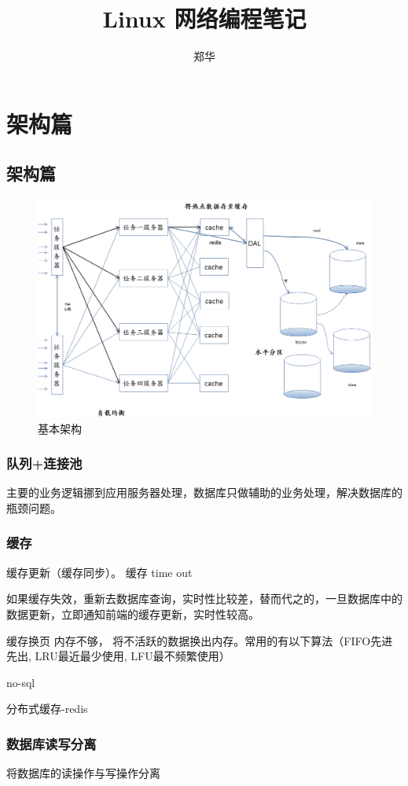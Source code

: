 \documentclass[UTF8,a4paper,12pt]{ctexbook}
\author{\kaishu 郑华}
\title{Linux  网络编程笔记}
\begin{document}
 	\maketitle
 	\tableofcontents
\chapter{架构篇}
	 \section{架构篇}
		\begin{figure}[ht]
			\centering
			\includegraphics[width=0.8\linewidth]{figures/server-Arch}
			\caption{基本架构}
			\label{fig:server-arch}
		\end{figure}
		 
		\subsection{队列+连接池}
			主要的业务逻辑挪到应用服务器处理，数据库只做辅助的业务处理，解决数据库的瓶颈问题。
		
		\subsection{缓存}
			缓存更新（缓存同步）。 缓存 time out
			
			如果缓存失效，重新去数据库查询，实时性比较差，替而代之的，一旦数据库中的数据更新，立即通知前端的缓存更新，实时性较高。
			
			缓存换页  内存不够， 将不活跃的数据换出内存。常用的有以下算法（FIFO先进先出, LRU最近最少使用, LFU最不频繁使用）
			
			no-sql
			
			分布式缓存-redis 
		\subsection{数据库读写分离}
			将数据库的读操作与写操作分离
			
\end{document}
